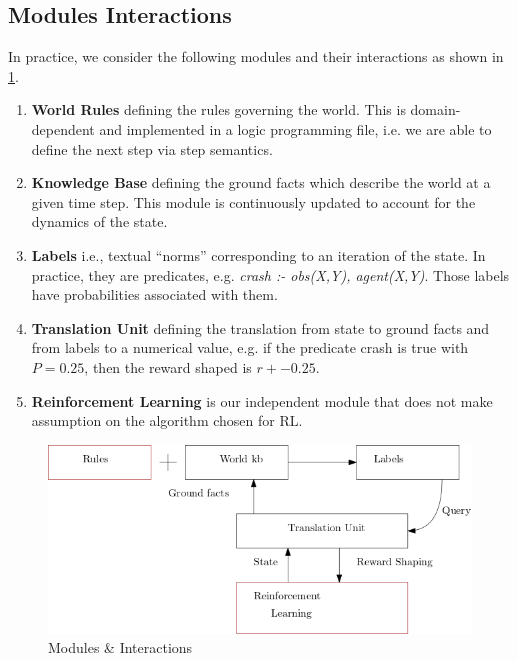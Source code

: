 \subsection{Modules Interactions}
\label{sec:modules}
In practice, we consider the following modules and their interactions as shown in \ref{fig:mods}.

\begin{enumerate}
  \item \textbf{World Rules} defining the rules governing the world. This is domain-dependent and implemented 
        in a logic programming file, i.e. we are able to define the next step via step semantics.
  \item \textbf{Knowledge Base} defining the ground facts which describe the world at a given time step. This module is 
        continuously updated to account for the dynamics of the
        state. 
  \item \textbf{Labels} i.e., textual ``norms'' corresponding to an
  iteration of the state. In practice, they are predicates, e.g. \textit{crash :- obs(X,Y), agent(X,Y)}. 
                    Those labels have probabilities associated with
                    them.
  \item \textbf{Translation Unit} defining the translation from state to ground facts and from labels to a numerical value, e.g. if the predicate crash is true with $P = 0.25$, then the reward shaped is $r + -0.25$. 
  \item \textbf{Reinforcement Learning} is our independent module that does not make assumption on the algorithm chosen for RL.
\end{enumerate}


\begin{figure}[H]
  \centering
  \includegraphics[scale=0.55]{figures/dynamics.png}
  \caption{Modules \& Interactions}
  \label{fig:mods}
\end{figure}

